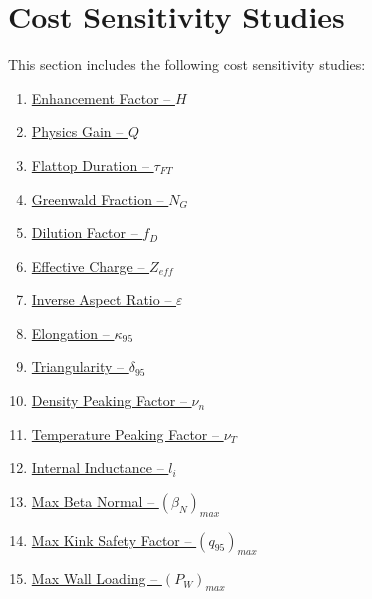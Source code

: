 \section{Cost Sensitivity Studies}
\label{section:studies}

This section includes the following cost sensitivity studies: ~

\begin{enumerate}
  \item \hyperref[subsection:sensitivity_H]{ Enhancement Factor -- $H$  }
  \item \hyperref[subsection:sensitivity_Q]{ Physics Gain -- $Q$  }
  \item \hyperref[subsection:sensitivity_tau_FT]{ Flattop Duration -- $\tau_{FT}$  }
  \item \hyperref[subsection:sensitivity_N_G]{ Greenwald Fraction -- $N_G$  }
  \item \hyperref[subsection:sensitivity_f_D]{ Dilution Factor -- $f_D$  }
  \item \hyperref[subsection:sensitivity_Z_eff]{ Effective Charge -- $Z_{eff}$  }
  \item \hyperref[subsection:sensitivity_epsilon]{ Inverse Aspect Ratio -- $\varepsilon$  }
  \item \hyperref[subsection:sensitivity_kappa_95]{ Elongation -- $\kappa_{95}$  }
  \item \hyperref[subsection:sensitivity_delta_95]{ Triangularity -- $\delta_{95}$  }
  \item \hyperref[subsection:sensitivity_nu_n]{ Density Peaking Factor -- $\nu_n$  }
  \item \hyperref[subsection:sensitivity_nu_T]{ Temperature Peaking Factor -- $\nu_T$  }
  \item \hyperref[subsection:sensitivity_l_i]{ Internal Inductance -- $l_i$  }
  \item \hyperref[subsection:sensitivity_max_beta_N]{ Max Beta Normal -- $(\beta_N)_{max}$  }
  \item \hyperref[subsection:sensitivity_max_q_95]{ Max Kink Safety Factor -- $({q_{95}})_{max}$  }
  \item \hyperref[subsection:sensitivity_max_P_W]{ Max Wall Loading -- $({P_W})_{max}$ }
\end{enumerate}

\clearpage

\newpage

  \label{subsection:sensitivity_H}

